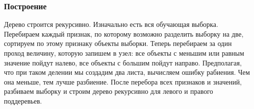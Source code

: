 \subsubsection{Построение}
Дерево строится рекурсивно. Изначально есть вся обучающая выборка. Перебираем каждый признак, по которому возможно разделить выборку на две, сортируем по этому признаку объекты выборки. Теперь перебираем за один проход величину, которую запишем в узел: все объекты с меньшим или равным значение пойдут налево, все объекты с большим пойдут направо. Предполагая, что при таком делении мы создадим два листа, вычисляем ошибку рабиения. Чем она меньше, тем лучше разбиение. После перебора всех признаков и значений, разбиваем выборку и строим дерево рекурсивно для левого и правого поддеревьев.
\pagebreak